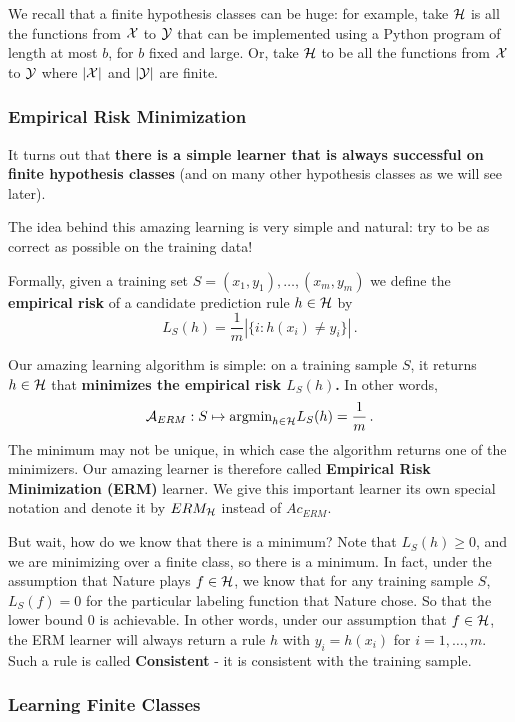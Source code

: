 We recall that a finite hypothesis classes can be huge: for example, take $\mathcal{H}$ is all the functions from $\mathcal{X}$ to $\mathcal{Y}$ that can be implemented using a Python program of length at most $b$, for $b$ fixed and large. Or, take $\mathcal{H}$ to be all the functions from $\mathcal{X}$ to $\mathcal{Y}$ where  $|\mathcal{X}|$ and $|\mathcal{Y}|$ are finite.

\subsubsection{Empirical Risk Minimization}

It turns out that {\bf there is a simple learner that is always successful on finite hypothesis classes} (and on many other hypothesis classes as we will see later).

The idea behind this amazing learning is very simple and natural: try to be as correct as possible on the training data!

Formally, given  a training set $S = (x_1,y_1),\ldots,(x_m,y_m)$ we define the {\bf empirical risk} of a candidate prediction rule $h\in\mathcal{H}$ by
$$L_S(h) = \frac{1}{m} |\{i : h(x_i)  \neq y_i\}|\,.$$

Our amazing learning algorithm is simple: on a training sample $S$, it returns $h \in \mathcal{H}$ that {\bf minimizes the empirical risk $L_S(h)$.} In other words,
\[
\mathcal{A}_{ERM} : S \mapsto \text{argmin}_{h\in\mathcal{H}} L_S(h) = \frac{1}{m} \,.
\]
The minimum may not be unique, in which case the algorithm returns one of the minimizers. Our amazing learner is therefore called \textbf{Empirical Risk Minimization (ERM)} learner. We give this important learner its own special notation and denote it by $ERM_{\mathcal{H}}$ instead of $Ac_{ERM}$.

But wait, how do we know that there is a minimum?  Note that $L_S(h)\geq 0$, and we are minimizing over a finite class, so there is a minimum. In fact, under the assumption that Nature plays $f\in\mathcal{H}$, we know that for any training sample $S$,  $L_S(f) = 0$ for the particular labeling function that Nature chose. So that the lower bound $0$ is achievable. In other words, under our assumption that $f\in\mathcal{H}$, the ERM learner will always return a rule  $h$ with $y_i = h(x_i)$ for $i=1,\ldots,m$. 
Such a rule is called \textbf{Consistent} - it is consistent with the training sample. 


\subsubsection{Learning Finite Classes}


